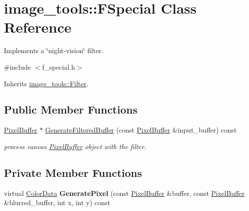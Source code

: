 \hypertarget{classimage__tools_1_1FSpecial}{}\section{image\+\_\+tools\+:\+:F\+Special Class Reference}
\label{classimage__tools_1_1FSpecial}


Implements a \char`\"{}night-\/vision\char`\"{} filter.  




{\ttfamily \#include $<$f\+\_\+special.\+h$>$}



Inherits \hyperlink{classimage__tools_1_1Filter}{image\+\_\+tools\+::\+Filter}.

\subsection*{Public Member Functions}
\begin{DoxyCompactItemize}
\item 
\hyperlink{classimage__tools_1_1PixelBuffer}{Pixel\+Buffer} $\ast$ \hyperlink{classimage__tools_1_1FSpecial_a31941fa317995cabd039469f2481089f}{Generate\+Filtered\+Buffer} (const \hyperlink{classimage__tools_1_1PixelBuffer}{Pixel\+Buffer} \&input\+\_\+buffer) const 
\begin{DoxyCompactList}\small\item\em process canvas \hyperlink{classimage__tools_1_1PixelBuffer}{Pixel\+Buffer} object with the filter. \end{DoxyCompactList}\end{DoxyCompactItemize}
\subsection*{Private Member Functions}
\begin{DoxyCompactItemize}
\item 
virtual \hyperlink{classimage__tools_1_1ColorData}{Color\+Data} {\bfseries Generate\+Pixel} (const \hyperlink{classimage__tools_1_1PixelBuffer}{Pixel\+Buffer} \&buffer, const \hyperlink{classimage__tools_1_1PixelBuffer}{Pixel\+Buffer} \&blurred\+\_\+buffer, int x, int y) const \hypertarget{classimage__tools_1_1FSpecial_a0b429e2d6bc2ecba6e4e10941d0fd63e}{}\label{classimage__tools_1_1FSpecial_a0b429e2d6bc2ecba6e4e10941d0fd63e}

\end{DoxyCompactItemize}


